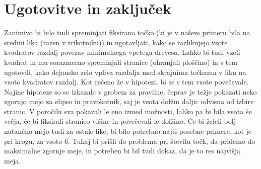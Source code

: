 \documentclass[a4paper]{article}
\begin{document}
\section{Ugotovitve in zaključek}

Zanimivo bi bilo tudi spreminjati fiksirano točko (ki je v našem primeru bila na sredini lika (razen v trikotniku)) in ugotavljati, kako se razlikujejo vsote kvadratov razdalj povezav minimalnega vpetega drevesa. Lahko bi tudi vzeli kvadrat in mu sorazmerno spreminjali stranice (ohranjali ploščino) in s tem ugotovili, kako dejansko zelo vpliva razdalja med skrajnima točkama v liku na vsoto kvadratov razdalj. Kot rečeno že v hipotezi, bi se s tem vsote povečevale.\\
Najine hipoteze so se izkazale v grobem za pravilne, čeprav je težje pokazati neko zgornjo mejo za elipso in pravokotnik, saj je vsota dolžin daljic odvisna od izbire stranic. V poročilu sva pokazali le eno izmed možnosti, lahko pa bi bila vsota še večja, če bi fiksirali stranico višine in povečevali le dolžino. Če bi želeli bolj natančno mejo tudi za ostale like, bi bilo potrebno najti posebne primere, kot je pri krogu, za vsoto 6. Tukaj bi prišli do problema pri številu točk, da pridemo do maksimalne zgornje meje, in potreben bi bil tudi dokaz, da je to res najvišja meja. 
\end{document}
